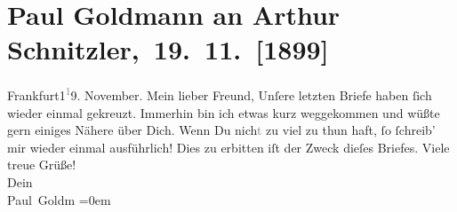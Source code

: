 

         
         \renewcommand{\erwaehntePersonen}{Personen: Paul Goldmann}
         \renewcommand{\erwaehnteOrte}{Orte: Frankfurt am Main, Wien}
         \renewcommand{\erwaehnteWerke}{}
               \section[ Paul Goldmann an Arthur Schnitzler, 19. 11. {[}1899{]}]{ Paul Goldmann an Arthur Schnitzler, 19. 11. {[}1899{]}}\nopagebreak{}\rehead{ }\begin{ledgroupsized}[t]{13cm}\normalsize\beginnumbering{} \toendnotes[C]{\smallbreak\pagebreak[2]} 
\pstart
           \centering{}{\pb}Frankfurt1\substVorne{}\textsuperscript{\textcolor{gray}{1}}\substDazwischen{}9\substHinten{}. November.\pend
           \pstart\center{}Mein lieber Freund,\pend\pstart
           Unſer\strikeout{\textcolor{gray}{l}}e letzten Briefe haben ſich wieder einmal gekreuzt.\pend
           \pstart
           Immerhin bin ich etwas kurz weggekommen und wüßte gern einiges Nähere über Dich.\pend
           \pstart
           Wenn Du nich\textcolor{gray}{t}{ }\strikeout{\textcolor{gray}{D}} zu viel zu thun haft, ſo ſchreib’ mir wieder einmal ausführlich!\pend
           \pstart
           Dies zu erbitten iſt der Zweck dieſes Briefes.\pend
           \pstart
           Viele treue Grüße! {\\[\baselineskip]}Dein {\\[\baselineskip]}\spacefill\mbox{Paul Goldm}\pend
           \leftskip=0em{}
         
         \endnumbering{}\end{ledgroupsized}  \newcommand{\dateiname}{L02894}\newcommand{\titel}{Paul Goldmann an Arthur Schnitzler, 19. 11. [1899]}\newcommand{\editorInnen}{Martin Anton Müller und Laura Untner}
      
